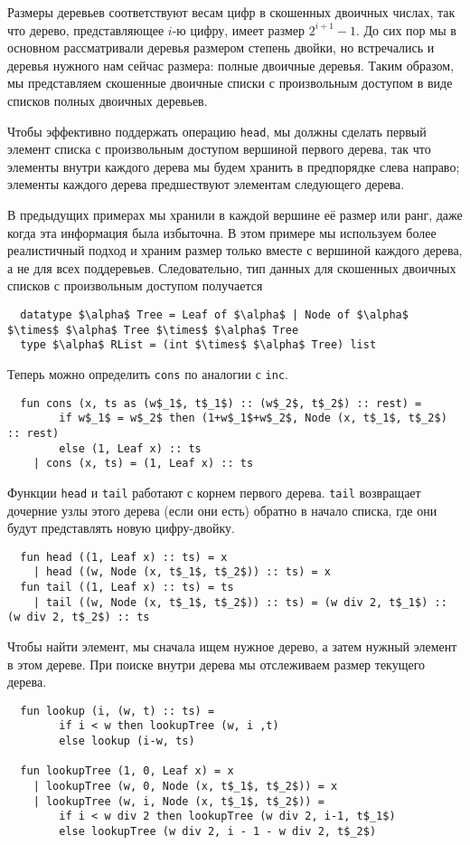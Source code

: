 Размеры деревьев соответствуют весам цифр в скошенных двоичных числах,
так что дерево, представляющее $i$-ю цифру, имеет размер $2^{i+1} -
1$. До сих пор мы в основном рассматривали деревья размером степень
двойки, но встречались и деревья нужного нам сейчас размера: полные
двоичные деревья. Таким образом, мы представляем скошенные двоичные
списки с произвольным доступом в виде списков полных двоичных
деревьев.

Чтобы эффективно поддержать операцию \lstinline!head!, мы должны
сделать первый элемент списка с произвольным доступом вершиной первого
дерева, так что элементы внутри каждого дерева мы будем хранить в
предпорядке слева направо; элементы каждого дерева предшествуют
элементам следующего дерева.

В предыдущих примерах мы хранили в каждой вершине её размер или ранг,
даже когда эта информация была избыточна. В этом примере мы используем
более реалистичный подход и храним размер только вместе с вершиной
каждого дерева, а не для всех поддеревьев. Следовательно, тип данных
для скошенных двоичных списков с произвольным доступом получается
\begin{lstlisting}
  datatype $\alpha$ Tree = Leaf of $\alpha$ | Node of $\alpha$ $\times$ $\alpha$ Tree $\times$ $\alpha$ Tree
  type $\alpha$ RList = (int $\times$ $\alpha$ Tree) list
\end{lstlisting}
Теперь можно определить \lstinline!cons! по аналогии с
\lstinline!inc!.
\begin{lstlisting}
  fun cons (x, ts as (w$_1$, t$_1$) :: (w$_2$, t$_2$) :: rest) =
        if w$_1$ = w$_2$ then (1+w$_1$+w$_2$, Node (x, t$_1$, t$_2$) :: rest)
        else (1, Leaf x) :: ts
    | cons (x, ts) = (1, Leaf x) :: ts
\end{lstlisting}
Функции \lstinline!head! и \lstinline!tail! работают с корнем первого
дерева. \lstinline!tail! возвращает дочерние узлы этого дерева (если
они есть) обратно в начало списка, где они будут представлять новую
цифру-двойку.
\begin{lstlisting}
  fun head ((1, Leaf x) :: ts) = x
    | head ((w, Node (x, t$_1$, t$_2$)) :: ts) = x
  fun tail ((1, Leaf x) :: ts) = ts
    | tail ((w, Node (x, t$_1$, t$_2$)) :: ts) = (w div 2, t$_1$) :: (w div 2, t$_2$) :: ts
\end{lstlisting}
Чтобы найти элемент, мы сначала ищем нужное дерево, а затем нужный
элемент в этом дереве. При поиске внутри дерева мы отслеживаем размер
текущего дерева.
\begin{lstlisting}
  fun lookup (i, (w, t) :: ts) =
        if i < w then lookupTree (w, i ,t)
        else lookup (i-w, ts)

  fun lookupTree (1, 0, Leaf x) = x
    | lookupTree (w, 0, Node (x, t$_1$, t$_2$)) = x
    | lookupTree (w, i, Node (x, t$_1$, t$_2$)) =
        if i < w div 2 then lookupTree (w div 2, i-1, t$_1$)
        else lookupTree (w div 2, i - 1 - w div 2, t$_2$)
\end{lstlisting}
